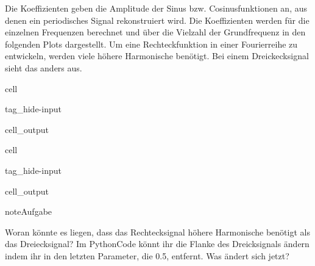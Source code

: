 \documentclass[letterpaper,10pt,english]{jupyterBook}
\begin{document}
\sphinxAtStartPar
Die Koeffizienten geben die Amplitude der Sinus\sphinxhyphen{} bzw. Cosinusfunktionen an, aus denen ein periodisches Signal rekonstruiert wird. Die Koeffizienten werden für die einzelnen Frequenzen berechnet und über die Vielzahl der Grundfrequenz in den folgenden Plots dargestellt. Um eine Rechteckfunktion in einer Fourierreihe zu entwickeln, werden viele höhere Harmonische benötigt. Bei einem Dreickecksignal sieht das anders aus.

\begin{sphinxuseclass}{cell}
\begin{sphinxuseclass}{tag_hide-input}\begin{sphinxVerbatimOutput}

\begin{sphinxuseclass}{cell_output}
\noindent{}

\end{sphinxuseclass}\end{sphinxVerbatimOutput}

\end{sphinxuseclass}
\end{sphinxuseclass}
\begin{sphinxuseclass}{cell}
\begin{sphinxuseclass}{tag_hide-input}\begin{sphinxVerbatimOutput}

\begin{sphinxuseclass}{cell_output}
\noindent{}

\end{sphinxuseclass}\end{sphinxVerbatimOutput}

\end{sphinxuseclass}
\end{sphinxuseclass}
\begin{sphinxadmonition}{note}{Aufgabe}

\sphinxAtStartPar
Woran könnte es liegen, dass das Rechtecksignal höhere Harmonische benötigt als das Dreiecksignal? Im Python\sphinxhyphen{}Code könnt ihr die Flanke des Dreicksignals ändern indem ihr in  den letzten Parameter, die 0.5, entfernt. Was ändert sich jetzt?
\end{sphinxadmonition}
\end{document}
